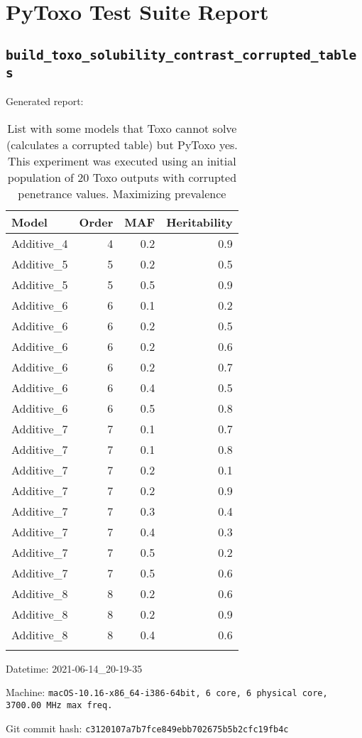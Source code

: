 \documentclass{article}
\begin{document}
\section*{PyToxo Test Suite Report}
\subsection*{\texttt{build\_toxo\_solubility\_contrast\_corrupted\_tables}}
Generated report:

\begin{longtable}[H]{lrrr}
\hline
 Model      &   Order &   MAF &   Heritability \\
\hline
 Additive\_4 &       4 &   0.2 &            0.9 \\
 Additive\_5 &       5 &   0.2 &            0.5 \\
 Additive\_5 &       5 &   0.5 &            0.9 \\
 Additive\_6 &       6 &   0.1 &            0.2 \\
 Additive\_6 &       6 &   0.2 &            0.5 \\
 Additive\_6 &       6 &   0.2 &            0.6 \\
 Additive\_6 &       6 &   0.2 &            0.7 \\
 Additive\_6 &       6 &   0.4 &            0.5 \\
 Additive\_6 &       6 &   0.5 &            0.8 \\
 Additive\_7 &       7 &   0.1 &            0.7 \\
 Additive\_7 &       7 &   0.1 &            0.8 \\
 Additive\_7 &       7 &   0.2 &            0.1 \\
 Additive\_7 &       7 &   0.2 &            0.9 \\
 Additive\_7 &       7 &   0.3 &            0.4 \\
 Additive\_7 &       7 &   0.4 &            0.3 \\
 Additive\_7 &       7 &   0.5 &            0.2 \\
 Additive\_7 &       7 &   0.5 &            0.6 \\
 Additive\_8 &       8 &   0.2 &            0.6 \\
 Additive\_8 &       8 &   0.2 &            0.9 \\
 Additive\_8 &       8 &   0.4 &            0.6 \\
\hline

\caption{List with some models that Toxo cannot solve (calculates a corrupted table) but PyToxo yes. This experiment was executed using an initial population of 20 Toxo outputs with corrupted penetrance values. Maximizing prevalence}
\end{longtable}
Datetime: 2021-06-14\_20-19-35

Machine: \texttt{macOS-10.16-x86\_64-i386-64bit, 6 core, 6 physical core, 3700.00 MHz max freq.}

Git commit hash: \texttt{c3120107a7b7fce849ebb702675b5b2cfc19fb4c}
\end{document}
